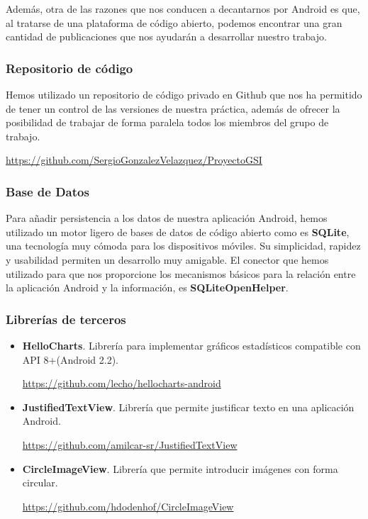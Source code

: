 Además, otra de las razones que nos conducen a decantarnos por Android es que, al tratarse de una plataforma de código abierto, podemos encontrar una gran cantidad de publicaciones que nos ayudarán a desarrollar nuestro trabajo.


\subsubsection{Repositorio de código}
Hemos utilizado un repositorio de código privado en Github que nos ha permitido de tener un control de las versiones de nuestra práctica, además de ofrecer la posibilidad de trabajar de forma paralela todos los miembros del grupo de trabajo.

\begin{center}
\url{https://github.com/SergioGonzalezVelazquez/ProyectoGSI}
\end{center}

\subsubsection{Base de Datos}
Para añadir persistencia a los datos de nuestra aplicación Android, hemos utilizado un motor ligero de bases de datos de código abierto como es \textbf{SQLite}, una tecnología muy cómoda para los dispositivos móviles. Su simplicidad, rapidez y usabilidad permiten un desarrollo muy amigable. El conector que hemos utilizado para que nos proporcione los mecanismos básicos para la relación entre la aplicación Android y la información, es \textbf{SQLiteOpenHelper}.

\subsubsection{Librerías de terceros}
\begin{itemize}
\item \textbf{HelloCharts}. Librería para implementar gráficos estadísticos compatible con API 8+(Android 2.2).

\begin{center}
\url{https://github.com/lecho/hellocharts-android}
\end{center}

\item \textbf{JustifiedTextView}. Librería que permite justificar texto en una aplicación Android.
\begin{center}
\url{https://github.com/amilcar-sr/JustifiedTextView}
\end{center}


\item \textbf{CircleImageView}. Librería que permite introducir imágenes con forma circular. 

\begin{center}
\url{https://github.com/hdodenhof/CircleImageView}
\end{center}
 


\end{itemize}
